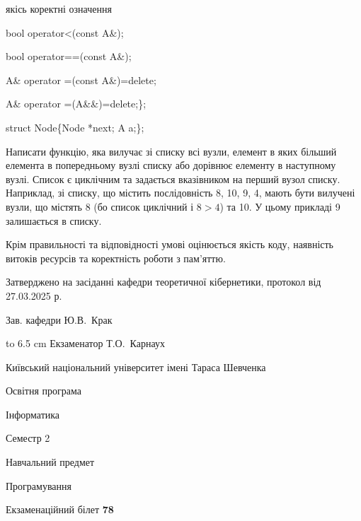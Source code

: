 \documentclass[12pt, ukrainian]{article}
\begin{document}
{\quad  якісь коректні означення 

\quad  bool operator<(const A\&); 

\quad  bool operator==(const A\&); 

\quad A\& operator =(const A\&)=delete; 

\quad  A\& operator =(A\&\&)=delete;\};

struct Node\{Node *next; A a;\};

 Написати функцію, яка вилучає зі списку всі вузли, елемент в яких більший елемента в попередньому вузлі списку або дорівнює елементу в наступному вузлі. Список є циклічним та задається вказівником на перший вузол списку. Наприклад, зі списку, що містить послідовність 8, 10, 9, 4, мають бути вилучені вузли, що містять 8 (бо список циклічний і $8>4$) та 10. У цьому прикладі 9 залишається в списку.

Крім правильності та відповідності умові оцінюється якість коду, наявність витоків ресурсів та коректність роботи з пам'яттю. 

}
{\smallskip\smallskip \begin {scriptsize} Затверджено на засіданні кафедри теоретичної кібернетики, протокол   від   27.03.2025 р.\par\smallskip\smallskip\smallskip\smallskip
{\parbox {6.5 cm} {Зав. кафедри \dotfill Ю.В.~Крак}}\hspace {0.7cm} {\hbox to 6.5 cm { Екзаменатор \dotfill Т.О.~Карнаух}} \end{scriptsize}}
\newpage
{{\begin {scriptsize}\par
{ \center  Київський національний університет імені Тараса Шевченка \par}
{\parbox {5 cm}{Освітня програма \hfill}{\parbox {7 cm}{Інформатика\hfill}}\parbox {6 cm}{\hfill Семестр 2}}\par
{\parbox {5 cm} {Навчальний предмет \hfill}\parbox {7 cm}{Програмування \hfill}\parbox {6cm}{\hfill}\par}\vspace{-15pt} \end{scriptsize}}{\center Екзаменаційний білет \No \textbf { 78 }\par}}
\end{document}
